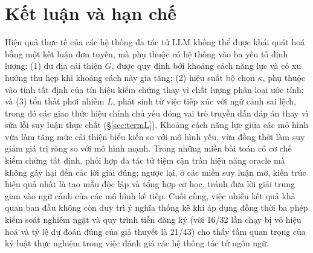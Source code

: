 \documentclass[12pt,a4paper]{article}
\begin{document}
\section{Kết luận và hạn chế}\label{sec:limits}

Hiệu quả thực tế của các hệ thống đa tác tử LLM không thể được khái quát hoá bằng một kết luận
đơn tuyến, mà phụ thuộc có hệ thống vào ba yếu tố định lượng: (1) dư địa cải thiện $G$, được
quy định bởi khoảng cách năng lực và có xu hướng thu hẹp khi khoảng cách này gia tăng; (2) hiệu
suất bộ chọn $\kappa$, phụ thuộc vào tính tất định của tín hiệu kiểm chứng thay vì chất lượng
phân loại ước tính; và (3) tổn thất phơi nhiễm $L$, phát sinh từ việc tiếp xúc với ngữ cảnh sai lệch,
trong đó các giao thức hiệu chỉnh chủ yếu đóng vai trò truyền dẫn đáp án thay vì sửa lỗi suy luận
thực chất (\S\ref{sec:termL}). Khoảng cách năng lực giữa các mô hình vừa làm tăng mức cải thiện
biểu kiến so với mô hình yếu, vừa đồng thời làm suy giảm giá trị ròng so với mô hình mạnh. Trong
những miền bài toán có cơ chế kiểm chứng tất định, phối hợp đa tác tử tiệm cận trần hiệu năng
oracle mà không gây hại đến các lời giải đúng; ngược lại, ở các miền suy luận mở, kiến trúc
hiệu quả nhất là tạo mẫu độc lập và tổng hợp cơ học, tránh đưa lời giải trung gian vào ngữ cảnh
của các mô hình kế tiếp. Cuối cùng, việc nhiều kết quả khả quan ban đầu không còn duy trì ý nghĩa
thống kê khi áp dụng đồng thời ba phép kiểm soát nghiêm ngặt và quy trình tiền đăng ký (với 16/32
lần chạy bị vô hiệu hoá và tỷ lệ dự đoán đúng của giả thuyết là 21/43) cho thấy tầm quan trọng của
kỷ luật thực nghiệm trong việc đánh giá các hệ thống tác tử ngôn ngữ.
\end{document}
